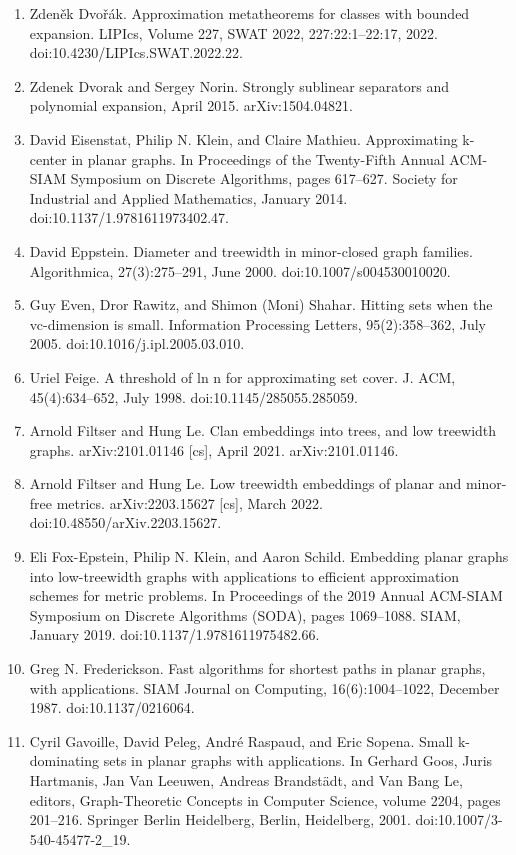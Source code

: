 \begin{enumerate}
\item[]  [20]  Zdeněk Dvořák.  Approximation metatheorems for classes with bounded expansion.  LIPIcs, Volume 227, SWAT 2022, 227:22:1–22:17, 2022.  doi:10.4230/LIPIcs.SWAT.2022.22.  
\item[]  [21]  Zdenek Dvorak and Sergey Norin.  Strongly sublinear separators and polynomial expansion, April 2015.  arXiv:1504.04821.  
\item[]  [22]  David Eisenstat, Philip N. Klein, and Claire Mathieu.  Approximating k-center in planar graphs.  In Proceedings of the Twenty-Fifth Annual ACM-SIAM Symposium on Discrete Algorithms, pages 617–627. Society for Industrial and Applied Mathematics, January 2014.  doi:10.1137/1.9781611973402.47.  
\item[]  [23]  David Eppstein.  Diameter and treewidth in minor-closed graph families.  Algorithmica, 27(3):275–291, June 2000.  doi:10.1007/s004530010020.  
\item[]  [24]  Guy Even, Dror Rawitz, and Shimon (Moni) Shahar.  Hitting sets when the vc-dimension is small.  Information Processing Letters, 95(2):358–362, July 2005.  doi:10.1016/j.ipl.2005.03.010.  
\item[]  [25]  Uriel Feige.  A threshold of ln n for approximating set cover.  J. ACM, 45(4):634–652, July 1998.  doi:10.1145/285055.285059.  
\item[]  [26]  Arnold Filtser and Hung Le.  Clan embeddings into trees, and low treewidth graphs.  arXiv:2101.01146 [cs], April 2021.  arXiv:2101.01146.  
\item[]  [27]  Arnold Filtser and Hung Le.  Low treewidth embeddings of planar and minor-free metrics.  arXiv:2203.15627 [cs], March 2022.  doi:10.48550/arXiv.2203.15627.  
\item[]  [28]  Eli Fox-Epstein, Philip N. Klein, and Aaron Schild.  Embedding planar graphs into low-treewidth graphs with applications to efficient approximation schemes for metric problems.  In Proceedings of the 2019 Annual ACM-SIAM Symposium on Discrete Algorithms (SODA), pages 1069–1088. SIAM, January 2019.  doi:10.1137/1.9781611975482.66.  
\item[]  [29]  Greg N. Frederickson.  Fast algorithms for shortest paths in planar graphs, with applications.  SIAM Journal on Computing, 16(6):1004–1022, December 1987.  doi:10.1137/0216064.  
\item[]  [30]  Cyril Gavoille, David Peleg, André Raspaud, and Eric Sopena.  Small k-dominating sets in planar graphs with applications.  In Gerhard Goos, Juris Hartmanis, Jan Van Leeuwen, Andreas Brandstädt, and Van Bang Le, editors, Graph-Theoretic Concepts in Computer Science, volume 2204, pages 201–216. Springer Berlin Heidelberg, Berlin, Heidelberg, 2001.  doi:10.1007/3-540-45477-2\_19.  

\end{enumerate}

